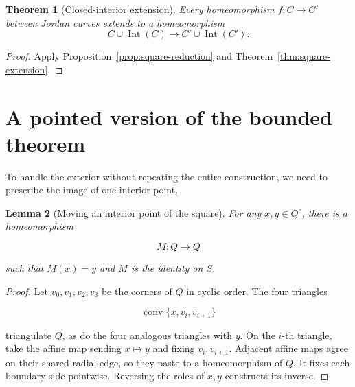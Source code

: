 \documentclass[11pt]{article}
\theoremstyle{mainplain}
\newtheorem{theorem}{Theorem}[section]
\newtheorem{lemma}[theorem]{Lemma}
\theoremstyle{mainroman}
\theoremstyle{definition}
\numberwithin{equation}{section}
\begin{document}
\begin{theorem}[Closed-interior extension]\label{thm:closed-interior-extension}
Every homeomorphism $f:C\to C'$ between Jordan curves extends to a
homeomorphism
\[
C\cup\operatorname{Int}(C)
 \longrightarrow
C'\cup\operatorname{Int}(C').
\]
\end{theorem}
\begin{proof}
Apply Proposition~\ref{prop:square-reduction} and Theorem~\ref{thm:square-extension}.
\end{proof}

\section{A pointed version of the bounded theorem}\label{a-pointed-version-of-the-bounded-theorem}

To handle the exterior without repeating the entire construction, we need to prescribe the image of one interior point.

\begin{lemma}[Moving an interior point of the square]\label{lem:square-point-mover}
For any \(x,y\in Q^\circ\), there is a homeomorphism

\[
M:Q\longrightarrow Q
\]

such that \(M(x)=y\) and \(M\) is the identity on \(S\).
\end{lemma}
\begin{proof}
Let \(v_0,v_1,v_2,v_3\) be the corners of \(Q\) in cyclic order. The four triangles

\[
\operatorname{conv}\{x,v_i,v_{i+1}\}
\]

triangulate \(Q\), as do the four analogous triangles with \(y\). On the \(i\)-th triangle, take the affine map sending \(x\mapsto y\) and fixing \(v_i,v_{i+1}\). Adjacent affine maps agree on their shared radial edge, so they paste to a homeomorphism of \(Q\). It fixes each boundary side pointwise. Reversing the roles of \(x,y\) constructs its inverse. \end{proof}
\end{document}
